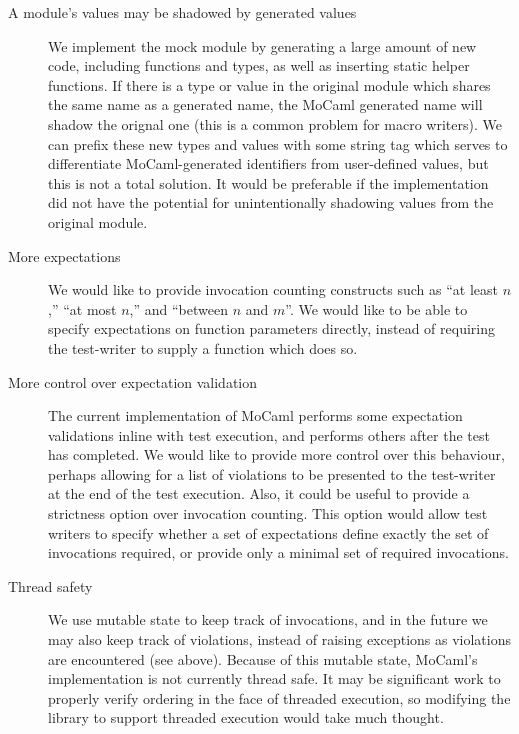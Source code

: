 \begin{description}

\item [A module's values may be shadowed by generated values]

  We implement the mock module by generating a large amount of new
  code, including functions and types, as well as inserting static
  helper functions. If there is a type or value in the original module
  which shares the same name as a generated name, the MoCaml generated
  name will shadow the orignal one (this is a common problem for macro
  writers). We can prefix these new types and values with some string
  tag which serves to differentiate MoCaml-generated identifiers from
  user-defined values, but this is not a total solution. It would be
  preferable if the implementation did not have the potential for
  unintentionally shadowing values from the original module.

  
\item [More expectations]

  We would like to provide invocation counting constructs such as ``at
  least $n$,'' ``at most $n$,'' and ``between $n$ and $m$''. We would
  like to be able to specify expectations on function parameters
  directly, instead of requiring the test-writer to supply a function
  which does so.


\item [More control over expectation validation]

  The current implementation of MoCaml performs some expectation
  validations inline with test execution, and performs others after
  the test has completed. We would like to provide more control over
  this behaviour, perhaps allowing for a list of violations to be
  presented to the test-writer at the end of the test execution. Also,
  it could be useful to provide a strictness option over invocation
  counting. This option would allow test writers to specify whether a
  set of expectations define exactly the set of invocations required,
  or provide only a minimal set of required invocations.

\item [Thread safety]

  We use mutable state to keep track of invocations, and in the future
  we may also keep track of violations, instead of raising exceptions
  as violations are encountered (see above). Because of this mutable
  state, MoCaml's implementation is not currently thread safe. It may
  be significant work to properly verify ordering in the face of
  threaded execution, so modifying the library to support threaded
  execution would take much thought.


\end{description}

